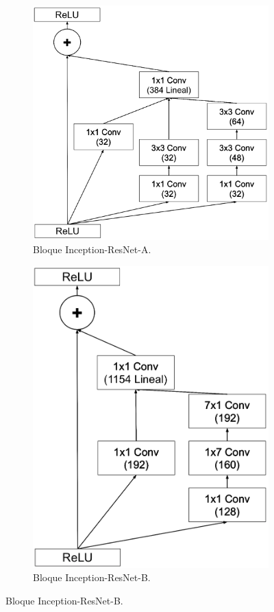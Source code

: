 \begin{figure}
    \centering
    \begin{subfigure}[t]{.45\textwidth}
      \centering
      \includegraphics[width=.8\linewidth]{Images/Inception-ResNet-A.png}
      \caption{Bloque Inception-ResNet-A.}
      \label{fig:Inception-ResNet-A}
    \end{subfigure}
    \hfill
    \begin{subfigure}[t]{.45\textwidth}
      \centering
      \includegraphics[width=.8\linewidth]{Images/Inception-ResNet-B.png}
      \caption{Bloque Inception-ResNet-B.}
      \label{fig:Inception-ResNet-B}
    \end{subfigure}
    

\end{figure}
